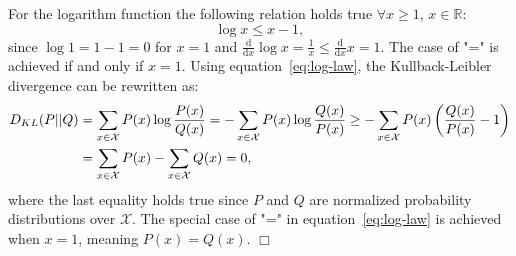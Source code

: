
\begin{answer}
For the logarithm function the following relation holds true $\forall x\geq 1$, $x\in\mathbb{R}$:
\begin{equation}
    \label{eq:log-law}
\log{x} \leq x - 1,
\end{equation}
since $\log{1} = 1 - 1 = 0$ for $x=1$ and $\frac{\mathrm{d}}{\mathrm{d}x}\log{x} = \frac{1}{x} \leq \frac{\mathrm{d}}{\mathrm{d}x} x = 1$.
The case of "=" is achieved if and only if $x=1$.  
Using equation~\ref{eq:log-law}, the Kullback-Leibler divergence can be rewritten as:
\begin{align*}
    D_{KL}(P||Q) &= \sum_{x\in\cal X} P(x)\log\frac{P(x)}{Q(x)} = - \sum_{x\in\cal X} P(x)\log\frac{Q(x)}{P(x)} \geq - \sum_{x\in\cal X} P(x)\left(\frac{Q(x)}{P(x)} - 1\right) \\
              &= \sum_{x\in\cal X} P(x) - \sum_{x\in\cal X} Q(x) = 0,
\end{align*}
where the last equality holds true since $P$ and $Q$ are normalized probability distributions over $\mathcal{X}$.
The special case of "=" in equation~\ref{eq:log-law} is achieved when $x=1$, meaning $P(x)=Q(x)$.
\hfill \ensuremath{\Box}
\end{answer}
